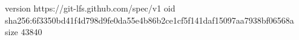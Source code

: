 version https://git-lfs.github.com/spec/v1
oid sha256:6f3350bd41f4d798d9fe0da55e4b86b2ce1cf5f141daf15097aa7938bf06568a
size 43840
